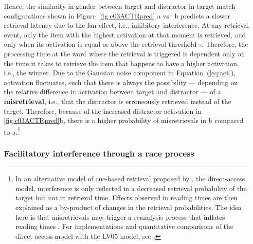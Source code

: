 \documentclass{cambridge7A}\usepackage[]{graphicx}\usepackage[]{color}
\begin{document}
Hence, the similarity in gender between target and distractor in target-match configurations shown in Figure~\ref{fig:c03ACTRpred} a vs.\ b predicts a slower retrieval latency due to the  fan effect, i.e., inhibitory interference. 
 At any retrieval event, only the item with the highest activation at that moment is retrieved, and only when its activation is equal or above the retrieval threshold $\tau$. Therefore, the processing time at the word where the retrieval is triggered is dependent only on the time it takes to retrieve the item that happens to have a higher activation, i.e., the winner.
Due to the Gaussian noise component in Equation~(\ref{eq:act}), activation fluctuates, such that there is always the possibility --- depending on the relative difference in activation between target and distractor --- of a  \textbf{misretrieval}, i.e., that the distractor is erroneously retrieved instead of the target. 
Therefore, because of the increased distractor activation in \ref{fig:c03ACTRpred}b, there is a higher probability of misretrievals in b compared to a.\footnote{%
In an alternative model of cue-based retrieval proposed by \cite{McElree2006}, the direct-access model, interference is only reflected in a decreased retrieval probability of the target but not in retrieval time. 
  Effects observed in reading times are then explained as a by-product of changes in the retrieval probabilities. The idea here is that misretrievals may trigger a reanalysis process that inflates reading times \citep{McElree1993}. For  implementations and quantitative comparisons of the direct-access model \citep{McElree2006} with the LV05 model, see \cite{NicenboimRetrieval2018,LissonEtAl2020}.}

\subsubsection{Facilitatory interference through a race process}
\end{document}
